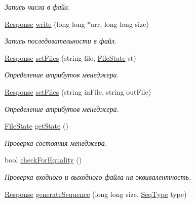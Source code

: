 \begin{DoxyCompactItemize}
\begin{DoxyCompactList}\small\item\em Запись числа в файл. \end{DoxyCompactList}\item 
\hyperlink{_structures_8h_ab3500e5d3c915d1b5cc58dcab8673fd4}{Response} \hyperlink{class_file_manager_a1a22f9564b45af8380f3f000aef842e4}{write} (long long $\ast$arr, long long size)
\begin{DoxyCompactList}\small\item\em Запись последовательности в файл. \end{DoxyCompactList}\item 
\hyperlink{_structures_8h_ab3500e5d3c915d1b5cc58dcab8673fd4}{Response} \hyperlink{class_file_manager_a129c4ce6a95650d8e71498a826b21cee}{set\+Files} (string file, \hyperlink{_structures_8h_a57306ae0f9e356347388234ed69e0ce7}{File\+State} st)
\begin{DoxyCompactList}\small\item\em Определение атрибутов менеджера. \end{DoxyCompactList}\item 
\hyperlink{_structures_8h_ab3500e5d3c915d1b5cc58dcab8673fd4}{Response} \hyperlink{class_file_manager_a646a785617b12f18c2e79bd471c943f8}{set\+Files} (string in\+File, string out\+File)
\begin{DoxyCompactList}\small\item\em Определение атрибутов менеджера. \end{DoxyCompactList}\item 
\hyperlink{_structures_8h_a57306ae0f9e356347388234ed69e0ce7}{File\+State} \hyperlink{class_file_manager_abd4cbc2b218ab1828ae376a4a9137057}{get\+State} ()
\begin{DoxyCompactList}\small\item\em Проверка состояния менеджера. \end{DoxyCompactList}\item 
bool \hyperlink{class_file_manager_ab490a5a5882d33781dcb6d1d42945d97}{check\+For\+Equality} ()
\begin{DoxyCompactList}\small\item\em Проверка входного и выходного файла на эквивалентность. \end{DoxyCompactList}\item 
\hyperlink{_structures_8h_ab3500e5d3c915d1b5cc58dcab8673fd4}{Response} \hyperlink{class_file_manager_a73fc5901898b3a82441dc0e7b5a9ccf7}{generate\+Sequence} (long long size, \hyperlink{_structures_8h_a76639e910448c3333d0f4d204e53c2c1}{Seq\+Type} type)

\end{DoxyCompactItemize}
